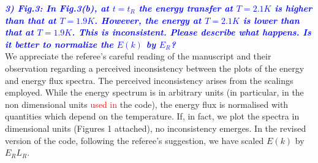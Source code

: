 \documentclass[a4paper,10pt]{article}
\def\red#1{\textcolor{red}{#1}}
\def\blue#1{\textcolor{blue}{#1}}
\def\refcomment#1{\textbf{\blue{\emph{#1}}}\\}
\begin{document}





    \refcomment{3) Fig.3: In Fig.3(b), at $t = t_R$ the energy transfer at $T = 2.1K$ is
    higher than that at $T = 1.9K$. However, the energy at $T = 2.1K$ is lower
    than that at $T = 1.9K$. This is inconsistent. Please describe what
    happens. Is it better to normalize the $E(k)$ by $E_R$?}

    We appreciate the referee’s careful reading of the manuscript and 
their observation regarding a perceived inconsistency between the plots of 
the energy and energy flux spectra. The perceived inconsistency arises 
from the scalings employed. While the energy spectrum is in arbitrary 
units (in particular, in the non dimensional units \red{used in} the code), 
the energy flux is normalised with quantities which depend on the temperature. 
If, in fact, we plot the spectra in dimensional units (Figures 1 attached),
no inconsistency emerges. In the revised version of the code, following 
the referee's suggestion, we have scaled $E(k)$ by $E_R L_R$.
    
\end{document}
